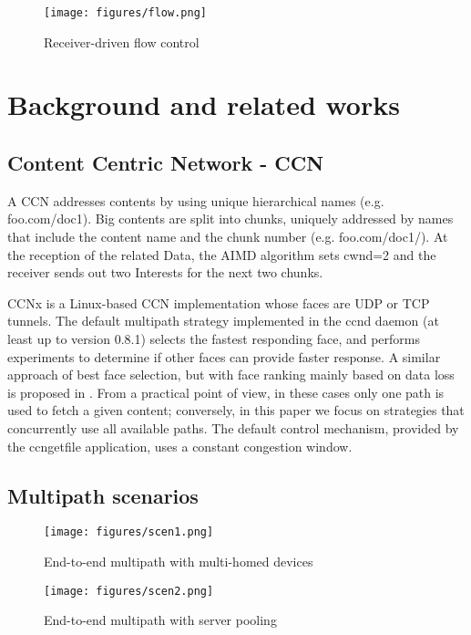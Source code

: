 \documentclass{sig-alternate-10pt}
\begin{document}
\begin{figure}[t]
\centering
\texttt{[image: figures/flow.png]}
\caption{Receiver-driven flow control}
\label{f:flow}
\vspace{-10pt}
\end{figure}

\section{Background and related works}
\subsection*{Content Centric Network - CCN}
A CCN addresses contents by using unique hierarchical names \cite{jacobson2009networking} (e.g. foo.com/doc1). Big contents are split into chunks, uniquely addressed by names that include the content name and the chunk number (e.g. foo.com/doc1/). At the reception of the related Data, the AIMD algorithm sets cwnd=2 and the receiver sends out two Interests for the next two chunks.

CCNx \cite{ccnx} is a Linux-based CCN implementation whose faces are UDP or TCP tunnels. The default multipath strategy implemented in the ccnd daemon (at least up to version 0.8.1) selects the fastest responding face, and performs experiments to determine if other faces can provide faster response. A similar approach of best face selection, but with face ranking mainly based on data loss is proposed in \cite{yi2013case}. From a practical point of view, in these cases only one path is used to fetch a given content; conversely, in this paper we focus on strategies that concurrently use all available paths. The default control mechanism, provided by the ccngetfile application, uses a constant congestion window.


\subsection*{Multipath scenarios}

\begin{figure}[t]
\centering
\texttt{[image: figures/scen1.png]}
\caption{End-to-end multipath with multi-homed devices}
\label{f:scen1}
\vspace{-10pt}
\end{figure}

\begin{figure}[t]
\centering
\texttt{[image: figures/scen2.png]}
\caption{End-to-end multipath with server pooling}
\label{f:scen2}
\vspace{-10pt}
\end{figure}
\end{document}
